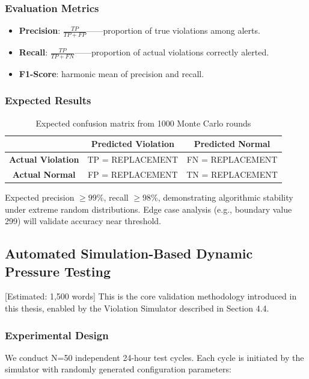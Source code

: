 \subsubsection{Evaluation Metrics}
\begin{itemize}
\item \textbf{Precision}: $\frac{TP}{TP+FP}$——proportion of true violations among alerts.
\item \textbf{Recall}: $\frac{TP}{TP+FN}$——proportion of actual violations correctly alerted.
\item \textbf{F1-Score}: harmonic mean of precision and recall.
\end{itemize}

\subsubsection{Expected Results}

\begin{table}[H]
\centering
\caption{Expected confusion matrix from 1000 Monte Carlo rounds}
\begin{tabular}{c|c|c}
\toprule
 & \textbf{Predicted Violation} & \textbf{Predicted Normal} \\
\midrule
\textbf{Actual Violation} & TP = REPLACEMENT & FN = REPLACEMENT \\
\textbf{Actual Normal} & FP = REPLACEMENT & TN = REPLACEMENT \\
\bottomrule
\end{tabular}
\end{table}

Expected precision $\ge 99\%$, recall $\ge 98\%$, demonstrating algorithmic stability under extreme random distributions. Edge case analysis (e.g., boundary value 299) will validate accuracy near threshold.

\subsection{Automated Simulation-Based Dynamic Pressure Testing} [Estimated: 1,500 words]
This is the core validation methodology introduced in this thesis, enabled by the Violation Simulator described in Section 4.4.

\subsubsection{Experimental Design}
We conduct N=50 independent 24-hour test cycles. Each cycle is initiated by the simulator with randomly generated configuration parameters:

